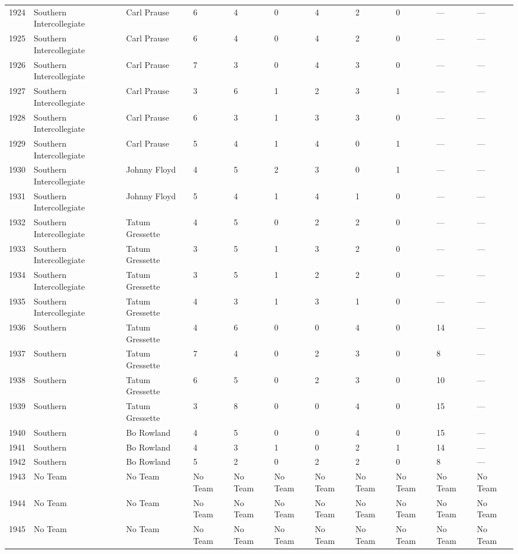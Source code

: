 \documentclass{article}
\begin{document}
\begin{tabular}{lllllllllll}
1924 & Southern Intercollegiate & Carl Prause & 6 & 4 & 0 & 4 & 2 & 0 & — & — \\
1925 & Southern Intercollegiate & Carl Prause & 6 & 4 & 0 & 4 & 2 & 0 & — & — \\
1926 & Southern Intercollegiate & Carl Prause & 7 & 3 & 0 & 4 & 3 & 0 & — & — \\
1927 & Southern Intercollegiate & Carl Prause & 3 & 6 & 1 & 2 & 3 & 1 & — & — \\
1928 & Southern Intercollegiate & Carl Prause & 6 & 3 & 1 & 3 & 3 & 0 & — & — \\
1929 & Southern Intercollegiate & Carl Prause & 5 & 4 & 1 & 4 & 0 & 1 & — & — \\
1930 & Southern Intercollegiate & Johnny Floyd & 4 & 5 & 2 & 3 & 0 & 1 & — & — \\
1931 & Southern Intercollegiate & Johnny Floyd & 5 & 4 & 1 & 4 & 1 & 0 & — & — \\
1932 & Southern Intercollegiate & Tatum Gressette & 4 & 5 & 0 & 2 & 2 & 0 & — & — \\
1933 & Southern Intercollegiate & Tatum Gressette & 3 & 5 & 1 & 3 & 2 & 0 & — & — \\
1934 & Southern Intercollegiate & Tatum Gressette & 3 & 5 & 1 & 2 & 2 & 0 & — & — \\
1935 & Southern Intercollegiate & Tatum Gressette & 4 & 3 & 1 & 3 & 1 & 0 & — & — \\
1936 & Southern & Tatum Gressette & 4 & 6 & 0 & 0 & 4 & 0 & 14 & — \\
1937 & Southern & Tatum Gressette & 7 & 4 & 0 & 2 & 3 & 0 & 8 & — \\
1938 & Southern & Tatum Gressette & 6 & 5 & 0 & 2 & 3 & 0 & 10 & — \\
1939 & Southern & Tatum Gressette & 3 & 8 & 0 & 0 & 4 & 0 & 15 & — \\
1940 & Southern & Bo Rowland & 4 & 5 & 0 & 0 & 4 & 0 & 15 & — \\
1941 & Southern & Bo Rowland & 4 & 3 & 1 & 0 & 2 & 1 & 14 & — \\
1942 & Southern & Bo Rowland & 5 & 2 & 0 & 2 & 2 & 0 & 8 & — \\
1943 & No Team & No Team & No Team & No Team & No Team & No Team & No Team & No Team & No Team & No Team \\
1944 & No Team & No Team & No Team & No Team & No Team & No Team & No Team & No Team & No Team & No Team \\
1945 & No Team & No Team & No Team & No Team & No Team & No Team & No Team & No Team & No Team & No Team \\

\end{tabular}
\end{document}
